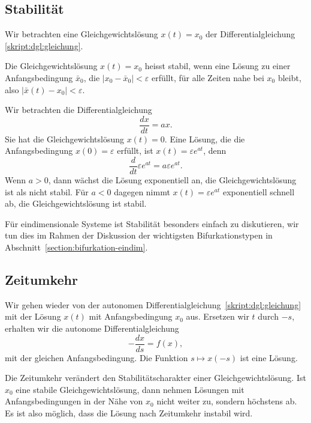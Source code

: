 \subsection{Stabilität}
Wir betrachten eine Gleichgewichtslösung $x(t)=x_0$ der Differentialgleichung
\eqref{skript:dgl:gleichung}.
\begin{definition}
Die Gleichgewichtslösung $x(t)=x_0$ heisst stabil, wenn eine Lösung zu
einer Anfangsbedingung $\bar x_0$, die $|x_0-\bar x_0|<\varepsilon$
erfüllt, für alle Zeiten nahe bei $x_0$ bleibt, also
$|\bar x(t)- x_0|<\varepsilon$.
\end{definition}

\begin{beispiel}
Wir betrachten die Differentialgleichung
\[
\frac{dx}{dt} = ax.
\]
Sie hat die Gleichgewichtslösung $x(t)=0$.
Eine Lösung, die die Anfangsbedingung $x(0)=\varepsilon$ erfüllt, 
ist $x(t)=\varepsilon e^{at}$, denn
\[
\frac{d}{dt}
\varepsilon e^{at}
=
a\varepsilon e^{at}.
\]
Wenn $a>0$, dann wächst die Lösung exponentiell an, die Gleichgewichtslösung 
ist als nicht stabil.
Für $a<0$ dagegen nimmt $x(t)=\varepsilon e^{at}$ exponentiell schnell ab,
die Gleichgewichtslösung ist stabil.
\end{beispiel}

Für eindimensionale Systeme ist Stabilität besonders einfach zu
diskutieren, wir tun dies im Rahmen der Diskussion der wichtigsten
Bifurkationstypen in Abschnitt~\ref{section:bifurkation-eindim}.

\subsection{Zeitumkehr}
Wir gehen wieder von der autonomen
Differentialgleichung~\eqref{skript:dgl:gleichung}
mit der Lösung $x(t)$ mit Anfangsbedingung $x_0$ aus.
Ersetzen wir $t$ durch $-s$, erhalten wir die autonome Differentialgleichung
\begin{equation}
-\frac{dx}{ds}
=
f(x),
\end{equation}
mit der gleichen Anfangsbedingung.
Die Funktion $s\mapsto x(-s)$ ist eine Lösung.

Die Zeitumkehr verändert den Stabilitätscharakter einer Gleichgewichtslösung.
Ist $x_0$ eine stabile Gleichgewichtslösung, dann nehmen Lösungen mit
Anfangsbedingungen in der Nähe von $x_0$ nicht weiter zu, sondern
höchstens ab.
Es ist also möglich, dass die Lösung nach Zeitumkehr instabil wird.


